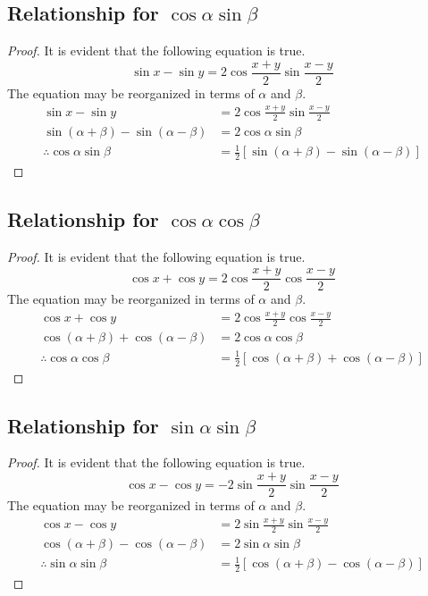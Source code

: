 \documentclass{article}
\begin{document}
\subsection{Relationship for $\cos\alpha\sin\beta$}
\begin{proof}
    It is evident that the following equation is true.
    \[
    \sin x - \sin y=2\cos\frac{x+y}{2}\sin\frac{x-y}{2}
    \]
    The equation may be reorganized in terms of $\alpha$ and $\beta$.
    \begin{align*}
        \sin x - \sin y&=2\cos\frac{x+y}{2}\sin\frac{x-y}{2} \\
        \sin(\alpha+\beta) - \sin(\alpha-\beta)&=2\cos\alpha\sin\beta \\
        \therefore \cos\alpha\sin\beta&=\frac{1}{2}[\sin(\alpha+\beta)-\sin(\alpha-\beta)]
    \end{align*}
\end{proof}

\subsection{Relationship for $\cos\alpha\cos\beta$}
\begin{proof}
    It is evident that the following equation is true.
    \[
    \cos x + \cos y=2\cos\frac{x+y}{2}\cos\frac{x-y}{2}
    \]
    The equation may be reorganized in terms of $\alpha$ and $\beta$.
    \begin{align*}
        \cos x + \cos y&=2\cos\frac{x+y}{2}\cos\frac{x-y}{2} \\
        \cos(\alpha+\beta) + \cos(\alpha-\beta)&=2\cos\alpha\cos\beta \\
        \therefore \cos\alpha\cos\beta&=\frac{1}{2}[\cos(\alpha+\beta)+\cos(\alpha-\beta)]
    \end{align*}
\end{proof}

\subsection{Relationship for $\sin\alpha\sin\beta$}
\begin{proof}
    It is evident that the following equation is true.
    \[
    \cos x - \cos y=-2\sin\frac{x+y}{2}\sin\frac{x-y}{2}
    \]
    The equation may be reorganized in terms of $\alpha$ and $\beta$.
    \begin{align*}
        \cos x - \cos y&=2\sin\frac{x+y}{2}\sin\frac{x-y}{2} \\
        \cos(\alpha+\beta) - \cos(\alpha-\beta)&=2\sin\alpha\sin\beta \\
        \therefore \sin\alpha\sin\beta&=\frac{1}{2}[\cos(\alpha+\beta)-\cos(\alpha-\beta)]
    \end{align*}
\end{proof}
\end{document}
